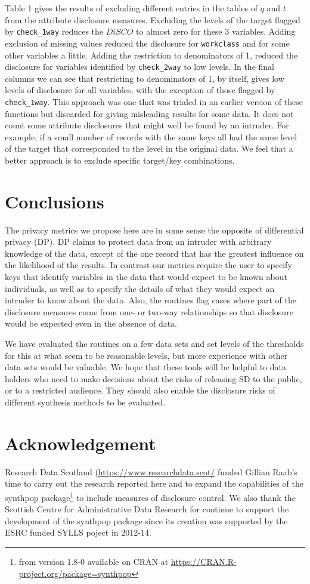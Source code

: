 \documentclass[12pt]{article}
\begin{document}
Table 1 gives the results of excluding different entries in the tables of $q$ and $t$ from the attribute disclosure measures.
Excluding the levels of the target flagged by \texttt{check\_1way} reduces the $DiSCO$ to almost zero for these 3 variables.
Adding exclusion of missing values reduced the disclosure for \texttt{workclass} and for some other variables a little. 
Adding the restriction to denominators of 1, reduced the disclosure for variables identified by \texttt{check\_2way} to low 
levels. In the final columns we can see that restricting to denominators of 1, by itself, gives low levels of disclosure for
all variables, with the exception of those flagged by \texttt{check\_1way}. This approach was one that was trialed in an earlier 
version of these functions but discarded for giving misleading results for some data. It does not count some attribute disclosures that might well be found by an intruder. For example, if a small number of records with the same keys all had the same level of the target that
corresponded to the level in the original data. We feel that a better approach is to exclude specific target/key combinations.

\section{Conclusions}
The privacy metrics we propose here are in some sense the opposite of differential privacy (DP).
DP claims to protect data from an intruder with arbitrary knowledge of the data, except of
the one record that has the greatest influence on the likelihood of the results. In contrast our metrics require the user to specify keys that identify variables in the data
that would expect to be known about individuals, as well as to 
specify the details of what they would expect an intruder 
to know about the data.  Also, the routines flag cases where part of the
disclosure measures come from one- or two-way relationships so that disclosure would be
expected even in the absence of data. 

We have evaluated the routines on a few data sets
and set levels of the thresholds for this at what seem to be reasonable levels, but 
more experience with other data sets would be valuable. 
We hope that these tools will be helpful to data holders who need to make decisions 
about the risks of releasing SD to the public, or to a restricted audience.
They should also enable the disclosure risks of different synthesis methods to be evaluated.


\section{Acknowledgement}
Research Data Scotland (\url{https://www.researchdata.scot/} funded Gillian Raab's time to carry 
out the research reported here and  to expand the capabilities of the synthpop package\footnote{
from version 1.8-0 available on CRAN at \url{https://CRAN.R-project.org/package=synthpop}
}
to include measures of disclosure control. We also thank the Scottish Centre for Administrative 
Data Research for continue to support the development of the synthpop package since its creation was
supported by the ESRC funded SYLLS poject in 2012-14.
\end{document}
